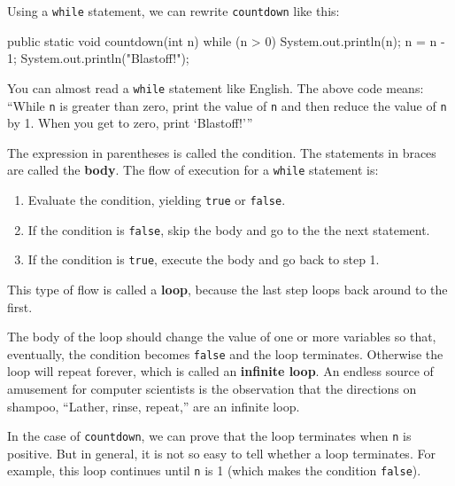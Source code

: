 \documentclass[12pt]{book}
\theoremstyle{exercise}
\newcommand{\java}[1]{\verb"#1"}
\newcommand{\java}[1]{\lstinline{#1}} %
\begin{document}
Using a \java{while} statement, we can rewrite \java{countdown} like this:

\begin{code}
    public static void countdown(int n) {
        while (n > 0) {
            System.out.println(n);
            n = n - 1;
        }
        System.out.println("Blastoff!");
    }
\end{code}

You can almost read a \java{while} statement like English.
The above code means: ``While \java{n} is greater than zero, print the value of \java{n} and then reduce the value of \java{n} by 1.
When you get to zero, print `Blastoff!'''

The expression in parentheses is called the condition.
The statements in braces are called the {\bf body}.
The flow of execution for a \java{while} statement is:

\begin{enumerate}

\item Evaluate the condition, yielding \java{true} or \java{false}.

\item If the condition is \java{false}, skip the body and go to the the next statement.

\item If the condition is \java{true}, execute the body and go back to step 1.

\end{enumerate}


This type of flow is called a {\bf loop}, because the last step loops back around to the first.

The body of the loop should change the value of one or more variables so that, eventually, the condition becomes \java{false} and the loop terminates.
Otherwise the loop will repeat forever, which is called an {\bf infinite loop}.
An endless source of amusement for computer scientists is the observation that the directions on shampoo, ``Lather, rinse, repeat,'' are an infinite loop.


In the case of \java{countdown}, we can prove that the loop terminates when \java{n} is positive.
But in general, it is not so easy to tell whether a loop terminates.
For example, this loop continues until \java{n} is 1 (which makes the condition \java{false}).
\end{document}
